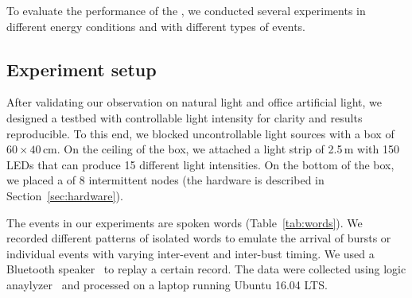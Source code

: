 To evaluate the performance of the \fullsys, we conducted several experiments in different energy conditions and with different types of events. 
\subsection{Experiment setup}
\label{sec:experiment_setup}

%

%
After validating our observation on natural light and office artificial light, we designed a testbed with controllable light intensity for clarity and results reproducible. To this end, we blocked uncontrollable light sources with a box of $60 \times 40$\,cm. On the ceiling of the box, we attached a light strip of 2.5\,m with 150 LEDs that can produce 15 different light intensities. On the bottom of the box, we placed a \fullcim of 8 intermittent nodes (the hardware is described in Section~\ref{sec:hardware}).

The events in our experiments are spoken words (Table~\ref{tab:words}). We recorded different patterns of isolated words to emulate the arrival of bursts or individual events with varying inter-event and inter-bust timing. We used a Bluetooth speaker~\cite{jbl} to replay a certain record. The data were collected using logic anaylyzer~\cite{saleae} and processed on a laptop running Ubuntu 16.04 LTS. 


